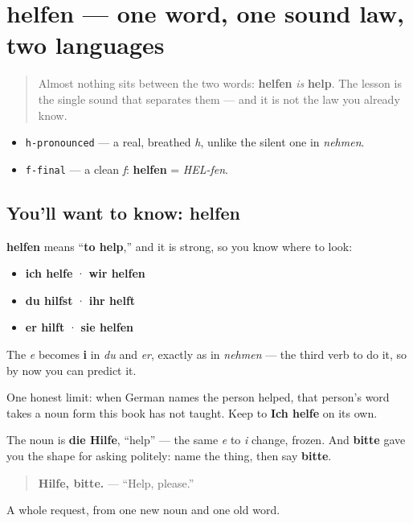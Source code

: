 \section[helfen]{helfen — one word, one sound law, two languages}

\label{lesson:GE-C25-helfen}



\begin{quote}
Almost nothing sits between the two words: \textbf{helfen} \emph{is} \textbf{help}. The lesson is the single sound that separates them — and it is not the law you already know.
\end{quote}

\begin{sounds}
\begin{itemize}
\raggedright
  \item \texttt{h-pronounced} — a real, breathed \emph{h}, unlike the silent one in \emph{nehmen}.
  \item \texttt{f-final} — a clean \emph{f}: \textbf{helfen} = \emph{HEL-fen}.
\end{itemize}
\end{sounds}

\subsection*{You'll want to know: helfen}
\textbf{helfen} means \textquotedblleft{}\textbf{to help},\textquotedblright{} and it is strong, so you know where to look:

\begin{itemize}
\raggedright
  \item \textbf{ich helfe} · \textbf{wir helfen}
  \item \textbf{du hilfst} · \textbf{ihr helft}
  \item \textbf{er hilft} · \textbf{sie helfen}
\end{itemize}

The \emph{e} becomes \textbf{i} in \emph{du} and \emph{er}, exactly as in \emph{nehmen} — the third verb to do it, so by now you can predict it.

One honest limit: when German names the person helped, that person's word takes a noun form this book has not taught. Keep to \textbf{Ich helfe} on its own.

\begin{culture}
The noun is \textbf{die Hilfe}, \textquotedblleft{}help\textquotedblright{} — the same \emph{e} to \emph{i} change, frozen. And \textbf{bitte} gave you the shape for asking politely: name the thing, then say \textbf{bitte}.

\begin{quote}
\textbf{Hilfe, bitte.} — \textquotedblleft{}Help, please.\textquotedblright{}
\end{quote}

A whole request, from one new noun and one old word.
\end{culture}

